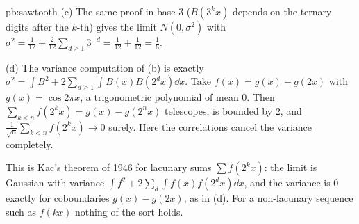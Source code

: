 \begin{solution}{pb:sawtooth}
(c) The same proof in base $3$ ($B(3^kx)$ depends on the ternary digits after the $k$-th) gives the limit $N(0,\sigma^2)$ with
$\sigma^2=\frac1{12}+\frac2{12}\sum_{d\ge1}3^{-d}=\frac1{12}+\frac1{12}=\frac16$.

(d) The variance computation of (b) is exactly $\sigma^2=\int B^2+2\sum_{d\ge1}\int B(x)B(2^dx)\dd x$. Take $f(x)=g(x)-g(2x)$ with $g(x)=\cos2\pi x$, a trigonometric
polynomial of mean $0$. Then $\sum_{k<n}f(2^kx)=g(x)-g(2^nx)$ telescopes, is bounded by $2$, and $\frac1{\sqrt n}\sum_{k<n}f(2^kx)\to0$ surely. Here the correlations
cancel the variance completely.

\leads This is Kac's theorem of 1946 for lacunary sums $\sum f(2^kx)$: the limit is Gaussian with variance $\int f^2+2\sum_d\int f(x)f(2^dx)\dd x$, and the variance is $0$
exactly for coboundaries $g(x)-g(2x)$, as in (d). For a non-lacunary sequence such as $f(kx)$ nothing of the sort holds.
\end{solution}

